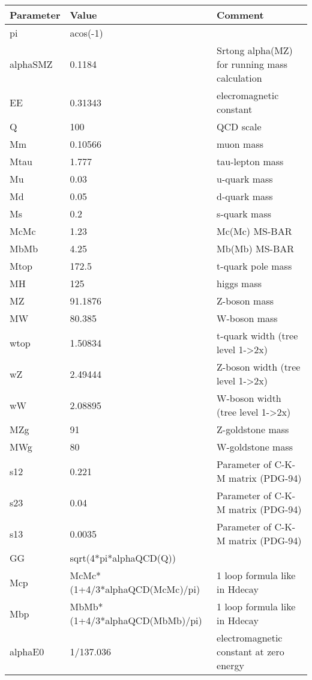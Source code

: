 \begin{tabular}{|l|l|l|} \hline
Parameter & Value & Comment \\ \hline
pi    &acos(-1)            & \\
alphaSMZ&0.1184              &Srtong alpha(MZ) for running mass calculation \\
EE    &0.31343             &elecromagnetic constant \\
Q     &100                 &QCD scale \\
Mm    &0.10566             &muon mass \\
Mtau  &1.777               &tau-lepton mass \\
Mu    &0.03                &u-quark mass \\
Md    &0.05                &d-quark mass \\
Ms    &0.2                 &s-quark mass \\
McMc  &1.23                &Mc(Mc)  MS-BAR \\
MbMb  &4.25                &Mb(Mb)  MS-BAR \\
Mtop  &172.5               &t-quark pole mass \\
MH    &125                 &higgs mass \\
MZ    &91.1876             &Z-boson mass \\
MW    &80.385              &W-boson mass \\
wtop  &1.50834             &t-quark width (tree level 1->2x) \\
wZ    &2.49444             &Z-boson width        (tree level 1->2x) \\
wW    &2.08895             &W-boson width        (tree level 1->2x) \\
MZg   &91                  &Z-goldstone mass \\
MWg   &80                  &W-goldstone mass \\
s12   &0.221               &Parameter of C-K-M matrix (PDG-94) \\
s23   &0.04                &Parameter of C-K-M matrix (PDG-94) \\
s13   &0.0035              &Parameter of C-K-M matrix (PDG-94) \\
GG    &sqrt(4*pi*alphaQCD(Q))& \\
Mcp   &McMc*(1+4/3*alphaQCD(McMc)/pi)&1 loop formula like in Hdecay \\
Mbp   &MbMb*(1+4/3*alphaQCD(MbMb)/pi)&1 loop formula like in Hdecay \\
alphaE0&1/137.036           &electromagnetic constant at zero energy \\

\end{tabular}
